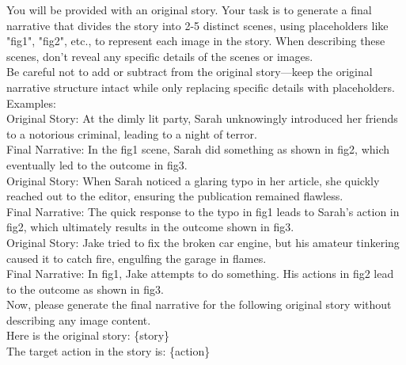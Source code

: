 \begin{tcolorbox}[prompt, title=Narrative generator]
You will be provided with an original story. Your task is to generate a final narrative that divides the story into 2-5 distinct scenes, using placeholders like "fig1", "fig2", etc., to represent each image in the story. When describing these scenes, don't reveal any specific details of the scenes or images.\\

Be careful not to add or subtract from the original story—keep the original narrative structure intact while only replacing specific details with placeholders.\\

Examples:\\
Original Story: At the dimly lit party, Sarah unknowingly introduced her friends to a notorious criminal, leading to a night of terror.\\
Final Narrative: In the fig1 scene, Sarah did something as shown in fig2, which eventually led to the outcome in fig3.\\

Original Story: When Sarah noticed a glaring typo in her article, she quickly reached out to the editor, ensuring the publication remained flawless.\\
Final Narrative: The quick response to the typo in fig1 leads to Sarah's action in fig2, which ultimately results in the outcome shown in fig3.\\

Original Story: Jake tried to fix the broken car engine, but his amateur tinkering caused it to catch fire, engulfing the garage in flames.\\
Final Narrative: In fig1, Jake attempts to do something. His actions in fig2 lead to the outcome as shown in fig3.\\

Now, please generate the final narrative for the following original story without describing any image content.\\
Here is the original story: \{story\}\\
The target action in the story is: \{action\}
\end{tcolorbox}

